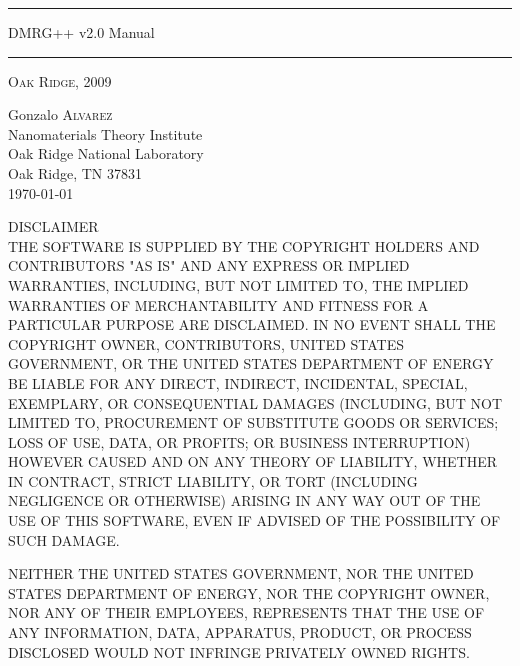 \documentclass[paper=letter]{scrartcl}
\newcommand{\HRule}{\noindent\rule{\linewidth}{1.5pt}}
\begin{document}
\begin{titlepage}
\HRule
\begin{flushright}
\LARGE  DMRG++ v2.0 Manual
\end{flushright}
\HRule
{}

%
\begin{center}
\textsc{Oak Ridge, 2009}
\end{center}

\end{titlepage}
% 
\begin{titlepage}
\noindent
\begin{minipage}{0.4\textwidth}
\begin{flushleft}
Gonzalo \textsc{Alvarez}\\
Nanomaterials Theory Institute\\
Oak Ridge National Laboratory\\[0.2cm]
Oak Ridge, TN 37831\\
\today
\end{flushleft}
\end{minipage}

\noindent
\begin{tiny}
\selectfont
\noindent
DISCLAIMER\\[0.2cm]
THE SOFTWARE IS SUPPLIED BY THE COPYRIGHT HOLDERS AND
CONTRIBUTORS "AS IS" AND ANY EXPRESS OR IMPLIED
WARRANTIES, INCLUDING, BUT NOT LIMITED TO, THE IMPLIED
WARRANTIES OF MERCHANTABILITY AND FITNESS FOR A
PARTICULAR PURPOSE ARE DISCLAIMED. IN NO EVENT SHALL THE
COPYRIGHT OWNER, CONTRIBUTORS, UNITED STATES GOVERNMENT,
OR THE UNITED STATES DEPARTMENT OF ENERGY BE LIABLE FOR
ANY DIRECT, INDIRECT, INCIDENTAL, SPECIAL, EXEMPLARY, OR
CONSEQUENTIAL DAMAGES (INCLUDING, BUT NOT LIMITED TO,
PROCUREMENT OF SUBSTITUTE GOODS OR SERVICES; LOSS OF USE,
DATA, OR PROFITS; OR BUSINESS INTERRUPTION) HOWEVER
CAUSED AND ON ANY THEORY OF LIABILITY, WHETHER IN
CONTRACT, STRICT LIABILITY, OR TORT (INCLUDING NEGLIGENCE
OR OTHERWISE) ARISING IN ANY WAY OUT OF THE USE OF THIS
SOFTWARE, EVEN IF ADVISED OF THE POSSIBILITY OF SUCH
DAMAGE.

NEITHER THE UNITED STATES GOVERNMENT, NOR THE UNITED STATES DEPARTMENT OF ENERGY, 
NOR THE COPYRIGHT OWNER, NOR
ANY OF THEIR EMPLOYEES, REPRESENTS THAT THE USE OF ANY
INFORMATION, DATA, APPARATUS, PRODUCT, OR PROCESS
DISCLOSED WOULD NOT INFRINGE PRIVATELY OWNED RIGHTS.\\[1cm]


\end{tiny}
\end{titlepage}
\end{document}
